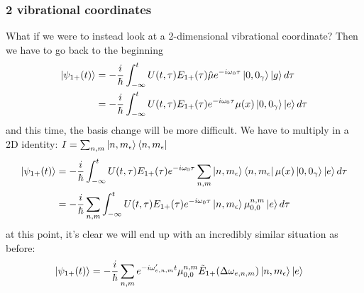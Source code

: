 \subsubsection{2 vibrational coordinates}
What if we were to instead look at a 2-dimensional vibrational coordinate? Then we have to go back to the beginning
\begin{align}
	\ket{\psi_{1+}(t)} &= -\frac{i}{\hbar} \int_{-\infty}^{t}U(t, \tau) E_{1+} (\tau) \hat{\mu}  e^{-i \omega_0 \tau}\ket{0, 0_{\gamma}}\ket{g}d\tau\\
	 &= -\frac{i}{\hbar} \int_{-\infty}^{t}U(t, \tau) E_{1+} (\tau)  e^{-i \omega_0 \tau}\mu(x)\ket{0,0_{\gamma}}\ket{e}d\tau
\end{align}
and this time, the basis change will be more difficult.  We have to multiply in a 2D identity: $I = \sum_{n, m}\ket{n, m_{\epsilon}}\bra{n, m_{\epsilon}}$
\begin{align}
	\ket{\psi_{1+}(t)} &= -\frac{i}{\hbar} \int_{-\infty}^{t}U(t, \tau) E_{1+} (\tau)  e^{-i \omega_0 \tau}  \sum_{n, m}\ket{n, m_{\epsilon}}\bra{n, m_{\epsilon}} \mu(x)\ket{0,0_{\gamma}}\ket{e}d\tau \\
	&= -\frac{i}{\hbar} \sum_{n, m} \int_{-\infty}^{t}U(t, \tau) E_{1+} (\tau)  e^{-i \omega_0 \tau}  \ket{n, m_{\epsilon}}\mu_{0,0}^{n,m} \ket{e}d\tau
\end{align}
at this point, it's clear we will end up with an incredibly similar situation as before:
\begin{align}
	\ket{\psi_{1+}(t)} &= -\frac{i}{\hbar} \sum_{n,m} e^{-i \omega'_{e, n, m} t}  \mu_{0, 0}^{n, m}   \tilde{E}_{1+} (\Delta \omega_{e, n, m}) \ket{n, m_{\epsilon}}\ket{e}
\end{align}

